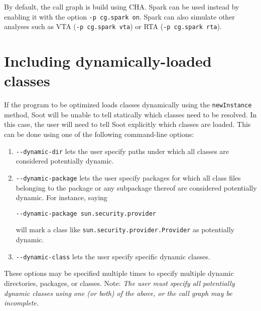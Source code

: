 \documentclass{article}
\begin{document}
By default, the call graph is build using CHA. Spark can be used instead
by enabling it with the option {\tt -p cg.spark on}. Spark can also simulate
other analyses such as VTA ({\tt -p cg.spark vta}) or RTA ({\tt -p cg.spark rta}).

\section{Including dynamically-loaded classes}
If the program to be optimized loads classes dynamically using the {\tt newInstance} method, Soot will be
unable to tell statically which classes need to be resolved. In this case, the user will need to tell Soot
explicitly which classes are loaded. This can be done using one of the following command-line options:
\begin{enumerate}
\item {\tt -}{\tt -dynamic-dir} lets the user specify paths under which all classes are considered potentially
dynamic. 
\item {\tt -}{\tt -dynamic-package} lets the user specify packages
for which all class files belonging to the package
or any subpackage thereof are considered potentially dynamic. For instance, saying 
\begin{verbatim}--dynamic-package sun.security.provider\end{verbatim}
will mark a class like {\tt sun.security.provider.Provider} as potentially dynamic.
\item {\tt -}{\tt -dynamic-class} lets the user specify specific dynamic classes.
\end{enumerate}
These options may be specified multiple times to specify multiple dynamic directories, packages, or classes.
Note: \textit{The user must specify all potentially dynamic classes using one (or both) of the above, or the call graph may be incomplete.}
\end{document}
